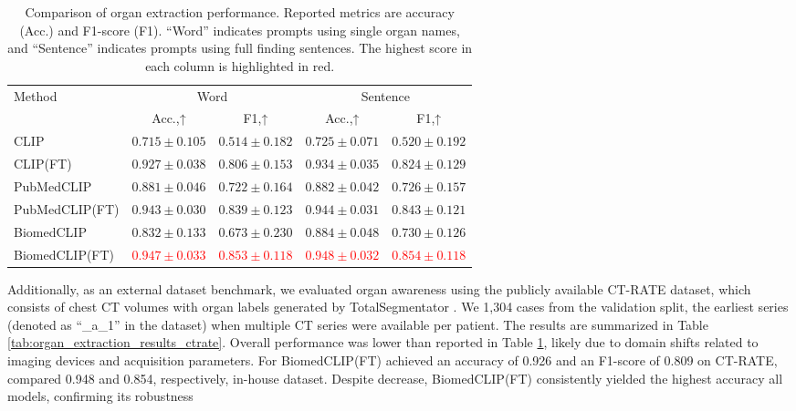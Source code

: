 \documentclass[bioengineering,article,submit,pdftex,moreauthors]{Definitions/mdpi}
\begin{document}
\begin{table}[ht]
  \centering
  \caption{Comparison of organ extraction performance. Reported metrics are accuracy (Acc.) and F1-score (F1). 
  “Word” indicates prompts using single organ names, and “Sentence” indicates prompts using full finding sentences. 
  The highest score in each column is highlighted in red.}
  \label{tab:organ_extraction_results}
  \begin{tabular}{lcccc}
    \toprule
    \multirow{2}{*}{Method} & \multicolumn{2}{c}{Word}               & \multicolumn{2}{c}{Sentence}            \\
    \cmidrule(lr){2-3}\cmidrule(lr){4-5}
                           & Acc.,↑ & F1,↑         & Acc.,↑   & F1,↑          \\ 
    \midrule
    CLIP                    & $0.715\pm0.105$ & $0.514\pm0.182$ & $0.725\pm0.071$ & $0.520\pm0.192$  \\
    CLIP(FT)                & $0.927\pm0.038$ & $0.806\pm0.153$ & $0.934\pm0.035$ & $0.824\pm0.129$  \\
    PubMedCLIP              & $0.881\pm0.046$ & $0.722\pm0.164$ & $0.882\pm0.042$ & $0.726\pm0.157$  \\
    PubMedCLIP(FT)          & $0.943\pm0.030$ & $0.839\pm0.123$ & $0.944\pm0.031$ & $0.843\pm0.121$  \\
    BiomedCLIP              & $0.832\pm0.133$ & $0.673\pm0.230$ & $0.884\pm0.048$ & $0.730\pm0.126$  \\
    BiomedCLIP(FT)          & \textcolor{red}{$0.947\pm0.033$} & \textcolor{red}{$0.853\pm0.118$} & \textcolor{red}{$0.948\pm0.032$} & \textcolor{red}{$0.854\pm0.118$}  \\
    \bottomrule
  \end{tabular}
\end{table}



Additionally, as an external dataset benchmark, we evaluated organ awareness using the publicly available CT-RATE dataset, which consists of chest CT volumes with organ labels generated by TotalSegmentator \cite{hamamci_ct2rep_2024}. 
We  1,304 cases from the validation split,  the earliest series (denoted as “\_a\_1” in the dataset) when multiple CT series were available per patient. 
The results are summarized in Table \ref{tab:organ_extraction_results_ctrate}. 
Overall performance was lower than  reported in Table \ref{tab:organ_extraction_results}, likely due to domain shifts related to imaging devices and acquisition parameters. 
For  BiomedCLIP(FT) achieved an accuracy of 0.926 and an F1-score of 0.809 on CT-RATE, compared  0.948 and 0.854, respectively,   in-house dataset. 
Despite  decrease, BiomedCLIP(FT) consistently yielded the highest accuracy  all models, confirming its robustness  
\end{document}
